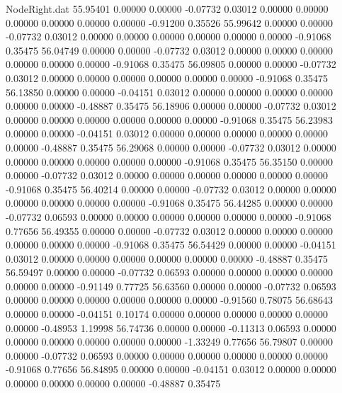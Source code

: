 \begin{filecontents}{NodeRight.dat}
  55.95401    0.00000    0.00000    -0.07732    0.03012    0.00000    0.00000    0.00000    0.00000    0.00000    0.00000   -0.91200    0.35526
  55.99642    0.00000    0.00000    -0.07732    0.03012    0.00000    0.00000    0.00000    0.00000    0.00000    0.00000   -0.91068    0.35475
  56.04749    0.00000    0.00000    -0.07732    0.03012    0.00000    0.00000    0.00000    0.00000    0.00000    0.00000   -0.91068    0.35475
  56.09805    0.00000    0.00000    -0.07732    0.03012    0.00000    0.00000    0.00000    0.00000    0.00000    0.00000   -0.91068    0.35475
  56.13850    0.00000    0.00000    -0.04151    0.03012    0.00000    0.00000    0.00000    0.00000    0.00000    0.00000   -0.48887    0.35475
  56.18906    0.00000    0.00000    -0.07732    0.03012    0.00000    0.00000    0.00000    0.00000    0.00000    0.00000   -0.91068    0.35475
  56.23983    0.00000    0.00000    -0.04151    0.03012    0.00000    0.00000    0.00000    0.00000    0.00000    0.00000   -0.48887    0.35475
  56.29068    0.00000    0.00000    -0.07732    0.03012    0.00000    0.00000    0.00000    0.00000    0.00000    0.00000   -0.91068    0.35475
  56.35150    0.00000    0.00000    -0.07732    0.03012    0.00000    0.00000    0.00000    0.00000    0.00000    0.00000   -0.91068    0.35475
  56.40214    0.00000    0.00000    -0.07732    0.03012    0.00000    0.00000    0.00000    0.00000    0.00000    0.00000   -0.91068    0.35475
  56.44285    0.00000    0.00000    -0.07732    0.06593    0.00000    0.00000    0.00000    0.00000    0.00000    0.00000   -0.91068    0.77656
  56.49355    0.00000    0.00000    -0.07732    0.03012    0.00000    0.00000    0.00000    0.00000    0.00000    0.00000   -0.91068    0.35475
  56.54429    0.00000    0.00000    -0.04151    0.03012    0.00000    0.00000    0.00000    0.00000    0.00000    0.00000   -0.48887    0.35475
  56.59497    0.00000    0.00000    -0.07732    0.06593    0.00000    0.00000    0.00000    0.00000    0.00000    0.00000   -0.91149    0.77725
  56.63560    0.00000    0.00000    -0.07732    0.06593    0.00000    0.00000    0.00000    0.00000    0.00000    0.00000   -0.91560    0.78075
  56.68643    0.00000    0.00000    -0.04151    0.10174    0.00000    0.00000    0.00000    0.00000    0.00000    0.00000   -0.48953    1.19998
  56.74736    0.00000    0.00000    -0.11313    0.06593    0.00000    0.00000    0.00000    0.00000    0.00000    0.00000   -1.33249    0.77656
  56.79807    0.00000    0.00000    -0.07732    0.06593    0.00000    0.00000    0.00000    0.00000    0.00000    0.00000   -0.91068    0.77656
  56.84895    0.00000    0.00000    -0.04151    0.03012    0.00000    0.00000    0.00000    0.00000    0.00000    0.00000   -0.48887    0.35475

\end{filecontents}
